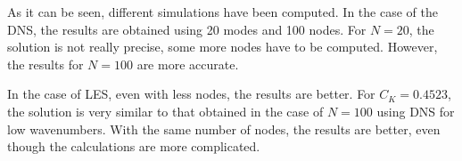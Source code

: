 As it can be seen, different simulations have been computed. In the case of the DNS, the results are obtained using 20 modes and 100 nodes. For $N=20$, the solution is not really precise, some more nodes have to be computed. However, the results for $N=100$ are more accurate.

In the case of LES, even with less nodes, the results are better. For $C_{K}=0.4523$, the solution is very similar to that obtained in the case of $N=100$ using DNS for low wavenumbers. With the same number of nodes, the results are better, even though the calculations are more complicated.